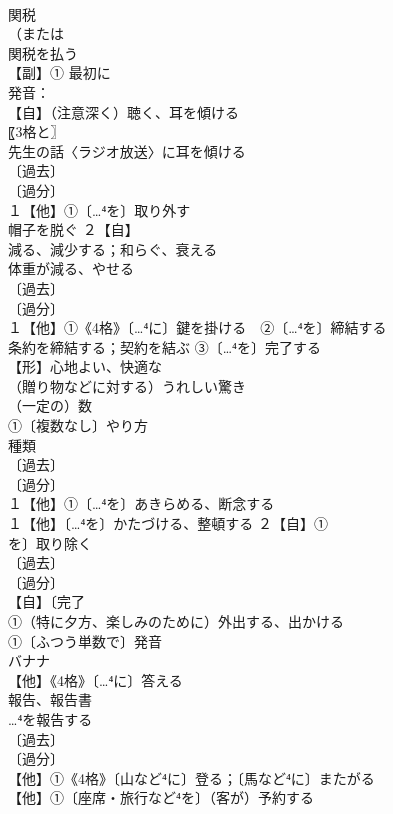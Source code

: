 \documentclass[8pt]{extreport}
\begin{document}
\begin{CJK}{UTF8}{min}
\\	関税 
\\	（または
\\	関税を払う
\\	【副】① 最初に 
\\	発音：
\\	【自】（注意深く）聴く、耳を傾ける 
\\	〖3格と〗
\\	先生の話〈ラジオ放送〉に耳を傾ける
\\	〔過去〕
\\	〔過分〕
\\	１【他】①〔…⁴を〕取り外す 
\\	帽子を脱ぐ ２【自】
\\	減る、減少する；和らぐ、衰える　
\\	体重が減る、やせる
\\	〔過去〕
\\	〔過分〕
\\	１【他】①《4格》〔…⁴に〕鍵を掛ける　②〔…⁴を〕締結する 
\\	条約を締結する；契約を結ぶ ③〔…⁴を〕完了する 
\\	【形】心地よい、快適な 
\\	（贈り物などに対する）うれしい驚き
\\	（一定の）数 
\\	①〔複数なし〕やり方 
\\	種類
\\	〔過去〕
\\	〔過分〕
\\	１【他】①〔…⁴を〕あきらめる、断念する 
\\	１【他】〔…⁴を〕かたづける、整頓する ２【自】①
\\	を〕取り除く
\\	〔過去〕
\\	〔過分〕
\\	【自】〔完了
\\	①（特に夕方、楽しみのために）外出する、出かける 
\\	①〔ふつう単数で〕発音 
\\	バナナ
\\	【他】《4格》〔…⁴に〕答える 
\\	報告、報告書 
\\	…⁴を報告する
\\	〔過去〕
\\	〔過分〕
\\	【他】①《4格》〔山など⁴に〕登る；〔馬など⁴に〕またがる 
\\	【他】①〔座席・旅行など⁴を〕（客が）予約する 

\end{CJK}
\end{document}
